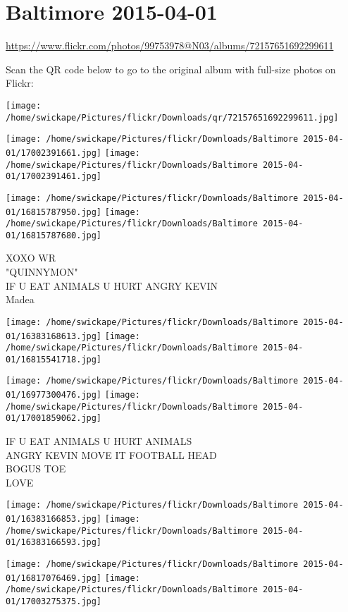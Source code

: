 \documentclass[10pt,letterpaper]{article}
\title{}
\author{}
\date{}
\begin{document}
\section*{Baltimore 2015-04-01}

\url{https://www.flickr.com/photos/99753978@N03/albums/72157651692299611}

Scan the QR code below to go to the original album with full-size photos on Flickr:

\texttt{[image: /home/swickape/Pictures/flickr/Downloads/qr/72157651692299611.jpg]}
\pagebreak

\texttt{[image: /home/swickape/Pictures/flickr/Downloads/Baltimore 2015-04-01/17002391661.jpg]}
\texttt{[image: /home/swickape/Pictures/flickr/Downloads/Baltimore 2015-04-01/17002391461.jpg]}

\texttt{[image: /home/swickape/Pictures/flickr/Downloads/Baltimore 2015-04-01/16815787950.jpg]}
\texttt{[image: /home/swickape/Pictures/flickr/Downloads/Baltimore 2015-04-01/16815787680.jpg]}

XOXO WR\\
"QUINNYMON"\\
IF U EAT ANIMALS U HURT ANGRY KEVIN\\
Madea
\pagebreak

\texttt{[image: /home/swickape/Pictures/flickr/Downloads/Baltimore 2015-04-01/16383168613.jpg]}
\texttt{[image: /home/swickape/Pictures/flickr/Downloads/Baltimore 2015-04-01/16815541718.jpg]}

\texttt{[image: /home/swickape/Pictures/flickr/Downloads/Baltimore 2015-04-01/16977300476.jpg]}
\texttt{[image: /home/swickape/Pictures/flickr/Downloads/Baltimore 2015-04-01/17001859062.jpg]}

IF U EAT ANIMALS U HURT ANIMALS\\
ANGRY KEVIN MOVE IT FOOTBALL HEAD\\
BOGUS TOE\\
LOVE
\pagebreak

\texttt{[image: /home/swickape/Pictures/flickr/Downloads/Baltimore 2015-04-01/16383166853.jpg]}
\texttt{[image: /home/swickape/Pictures/flickr/Downloads/Baltimore 2015-04-01/16383166593.jpg]}

\texttt{[image: /home/swickape/Pictures/flickr/Downloads/Baltimore 2015-04-01/16817076469.jpg]}
\texttt{[image: /home/swickape/Pictures/flickr/Downloads/Baltimore 2015-04-01/17003275375.jpg]}
\end{document}

